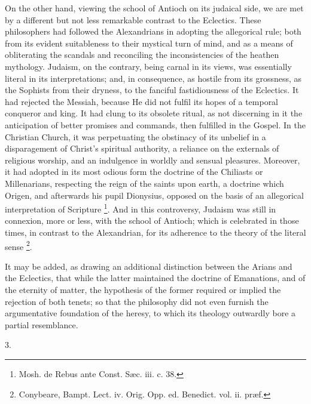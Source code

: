On the other hand, viewing the school of Antioch on its judaical
side, we are met by a different but not less remarkable contrast to
the Eclectics. These philosophers had followed the Alexandrians in
adopting the allegorical rule; both from its evident suitableness to
their mystical turn of mind, and as a means of obliterating the
scandals and reconciling the inconsistencies of the heathen mythology.
Judaism, on the contrary, being carnal in its views, was essentially
literal in its interpretations; and, in consequence, as hostile from
its grossness, as the Sophists from their dryness, to the fanciful
fastidiousness of the Eclectics. It had rejected the Messiah, because
He did not fulfil its hopes of a temporal conqueror and king. It
had clung to its obsolete ritual, as not discerning in it the
anticipation of better promises and commands, then fulfilled in the
Gospel. In the Christian Church, it was perpetuating the obstinacy of
its unbelief in a disparagement of Christ's spiritual authority, a
reliance on the externals of religious worship, and an indulgence in
worldly and sensual pleasures. Moreover, it had adopted in its most
odious form the doctrine of the Chiliasts or Millenarians, respecting
the reign of the saints upon earth, a doctrine which Origen, and
afterwards his pupil Dionysius, opposed on the basis of an allegorical
interpretation of Scripture \footnote{Mosh. de Rebus ante Const. Sæc. iii. c.
38.}.
And in this controversy, Judaism was still in connexion, more or less,
with the school of Antioch; which is celebrated in those times, in
contrast to the Alexandrian, for its adherence to the theory of the
literal sense \footnote{Conybeare, Bampt. Lect. iv. Orig. Opp. ed.
Benedict. vol. ii. præf.}.

It may be added, as drawing an additional distinction between the
Arians and the Eclectics, that while the latter maintained the
doctrine of Emanations, and of the eternity of matter, the hypothesis
of the former required or implied the rejection of both tenets; so
that the philosophy did not even furnish the argumentative foundation
of the heresy, to which its theology outwardly bore a partial
resemblance.

3.

